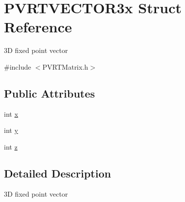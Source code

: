 \hypertarget{struct_p_v_r_t_v_e_c_t_o_r3x}{\section{P\+V\+R\+T\+V\+E\+C\+T\+O\+R3x Struct Reference}
\label{struct_p_v_r_t_v_e_c_t_o_r3x}
}


3\+D fixed point vector  




{\ttfamily \#include $<$P\+V\+R\+T\+Matrix.\+h$>$}

\subsection*{Public Attributes}
\begin{DoxyCompactItemize}
\item 
int \hyperlink{struct_p_v_r_t_v_e_c_t_o_r3x_a2f8278926a5d4fbf020e5e03aa046be6}{x}
\item 
int \hyperlink{struct_p_v_r_t_v_e_c_t_o_r3x_ad747dd88f70118bd73ed854c885676ed}{y}
\item 
int \hyperlink{struct_p_v_r_t_v_e_c_t_o_r3x_a7d289f9391dd17d64b567db573e06e65}{z}
\end{DoxyCompactItemize}


\subsection{Detailed Description}
3\+D fixed point vector 



 

